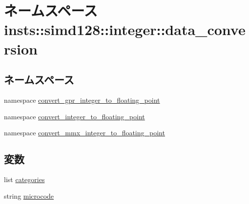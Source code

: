 \hypertarget{namespaceinsts_1_1simd128_1_1integer_1_1data__conversion}{
\section{ネームスペース insts::simd128::integer::data\_\-conversion}
\label{namespaceinsts_1_1simd128_1_1integer_1_1data__conversion}
}
\subsection*{ネームスペース}
\begin{DoxyCompactItemize}
\item 
namespace \hyperlink{namespaceinsts_1_1simd128_1_1integer_1_1data__conversion_1_1convert__gpr__integer__to__floating__point}{convert\_\-gpr\_\-integer\_\-to\_\-floating\_\-point}
\item 
namespace \hyperlink{namespaceinsts_1_1simd128_1_1integer_1_1data__conversion_1_1convert__integer__to__floating__point}{convert\_\-integer\_\-to\_\-floating\_\-point}
\item 
namespace \hyperlink{namespaceinsts_1_1simd128_1_1integer_1_1data__conversion_1_1convert__mmx__integer__to__floating__point}{convert\_\-mmx\_\-integer\_\-to\_\-floating\_\-point}
\end{DoxyCompactItemize}
\subsection*{変数}
\begin{DoxyCompactItemize}
\item 
list \hyperlink{namespaceinsts_1_1simd128_1_1integer_1_1data__conversion_a273cf0f1630af14c1582f05e53354a55}{categories}
\item 
string \hyperlink{namespaceinsts_1_1simd128_1_1integer_1_1data__conversion_a770f11a173e99389a8802f0107ed8f52}{microcode}
\end{DoxyCompactItemize}


